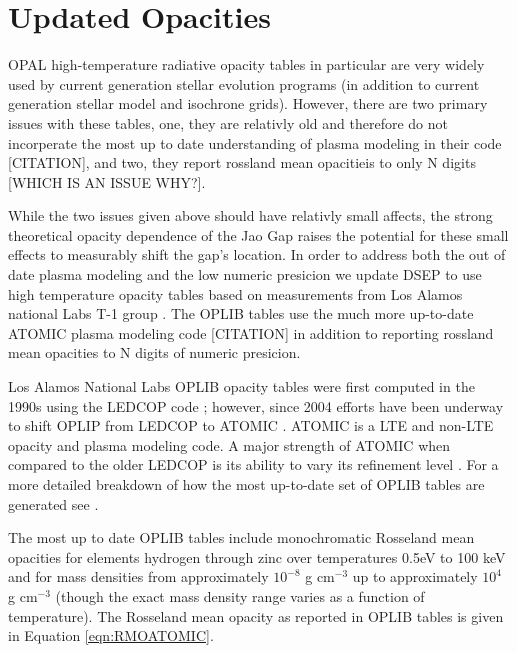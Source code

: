 \section{Updated Opacities}\label{sec:opac}
OPAL high-temperature radiative opacity tables in particular are very widely
used by current generation stellar evolution programs (in addition to current
generation stellar model and isochrone grids). However, there are two primary
issues with these tables, one, they are relativly old and therefore do not
incorperate the most up to date understanding of plasma modeling in their code
{\color{red} [CITATION]}, and two, they report rossland mean opacitieis to only
{\color{red} N} digits {\color{red} [WHICH IS AN ISSUE WHY?]}.

While the two issues given above should have relativly small affects, the
strong theoretical opacity dependence of the Jao Gap raises the potential for
these small effects to measurably shift the gap's location. In order to address
both the out of date plasma modeling and the low numeric presicion we update
DSEP to use high temperature opacity tables based on measurements from Los
Alamos national Labs T-1 group \citep[OPLIB,][]{Colgan2016}. The OPLIB tables
use the much more up-to-date ATOMIC plasma modeling code {\color{red}
[CITATION]} in addition to reporting rossland mean opacities to {\color{red} N}
digits of numeric presicion.

Los Alamos National Labs OPLIB opacity tables were first computed in the 1990s
using the LEDCOP code \citep{Magee1995}; however, since 2004 efforts have been
underway to shift OPLIP from LEDCOP to ATOMIC \citep{Magee2004}. ATOMIC is a
LTE and non-LTE opacity and plasma modeling code. A major strength of ATOMIC
when compared to the older LEDCOP is its ability to vary its refinement level
\citep{Fontes2016}. For a more detailed breakdown of how the most up-to-date
set of OPLIB tables are generated see \citep{Colgan2016}.

The most up to date OPLIB tables include monochromatic Rosseland mean opacities
for elements hydrogen through zinc over temperatures 0.5eV to 100 keV and for
mass densities from approximately $10^{-8}$ g cm$^{-3}$ up to approximately
$10^{4}$ g cm$^{-3}$ (though the exact mass density range varies as a function
of temperature). The Rosseland mean opacity as reported in OPLIB tables is given
in Equation \ref{eqn:RMOATOMIC}.

